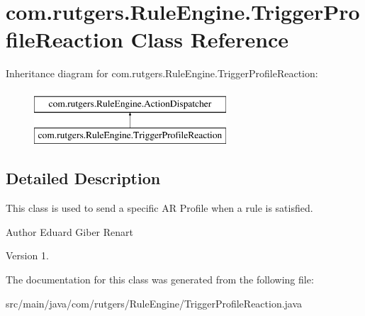 \hypertarget{classcom_1_1rutgers_1_1RuleEngine_1_1TriggerProfileReaction}{}\section{com.\+rutgers.\+Rule\+Engine.\+Trigger\+Profile\+Reaction Class Reference}
\label{classcom_1_1rutgers_1_1RuleEngine_1_1TriggerProfileReaction}
Inheritance diagram for com.\+rutgers.\+Rule\+Engine.\+Trigger\+Profile\+Reaction\+:\begin{figure}[H]
\begin{center}
\leavevmode
\includegraphics[height=2.000000cm]{classcom_1_1rutgers_1_1RuleEngine_1_1TriggerProfileReaction}
\end{center}
\end{figure}


\subsection{Detailed Description}
This class is used to send a specific AR Profile when a rule is satisfied.

\begin{DoxyAuthor}{Author}
Eduard Giber Renart 
\end{DoxyAuthor}
\begin{DoxyVersion}{Version}
1. 
\end{DoxyVersion}


The documentation for this class was generated from the following file\+:\begin{DoxyCompactItemize}
\item 
src/main/java/com/rutgers/\+Rule\+Engine/Trigger\+Profile\+Reaction.\+java\end{DoxyCompactItemize}
